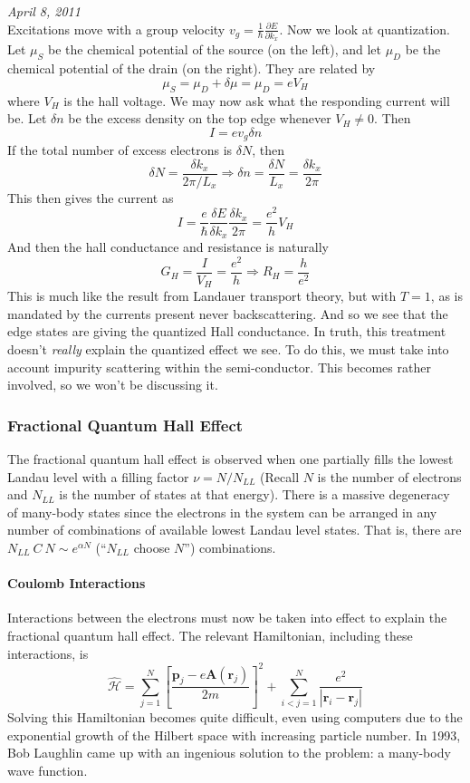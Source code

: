 \documentclass{article}
\begin{document}
	\noindent \textit{April 8, 2011}\\
	
	\noindent Excitations move with a group velocity $v_g=\frac{1}{\hbar}\frac{\partial E}{\partial k_x}$. Now we look at quantization. Let $\mu_S$ be the chemical potential of the source (on the left), and let $\mu_D$ be the chemical potential of the drain (on the right). They are related by
	$$\mu_S=\mu_D+\delta\mu=\mu_D=eV_H$$
	where $V_H$ is the hall voltage. We may now ask what the responding current will be. Let $\delta n$ be the excess density on the top edge whenever $V_H\neq 0$. Then 
	$$I=ev_g\delta n$$
	If the total number of excess electrons is $\delta N$, then
	$$\delta N=\frac{\delta k_x}{2\pi/L_x}\Rightarrow \delta n=\frac{\delta N}{L_x}=\frac{\delta k_x}{2\pi}$$
	This then gives the current as
	$$I=\frac{e}{\hbar}\frac{\delta E}{\delta k_x}\frac{\delta k_x}{2\pi}=\frac{e^2}{h}V_{H}$$
	And then the hall conductance and resistance is naturally
	$$G_H=\frac{I}{V_H}=\frac{e^2}{h}\Rightarrow R_H=\frac{h}{e^2}$$
	This is much like the result from Landauer transport theory, but with $T=1$, as is mandated by the currents present never backscattering. And so we see that the edge states are giving the quantized Hall conductance. In truth, this treatment doesn't \emph{really} explain the quantized effect we see. To do this, we must take into account impurity scattering within the semi-conductor. This becomes rather involved, so we won't be discussing it.
	
	\subsubsection{Fractional Quantum Hall Effect}
	The fractional quantum hall effect is observed when one partially fills the lowest Landau level with a filling factor $\nu=N/N_{LL}$ (Recall $N$ is the number of electrons and $N_{LL}$ is the number of states at that energy). There is a massive degeneracy of many-body states since the electrons in the system can be arranged in any number of combinations of available lowest Landau level states. That is, there are $N_{LL}\ C\ N\sim e^{\alpha N}$ (``$N_{LL}$ choose $N$'') combinations.
	\paragraph{Coulomb Interactions} Interactions between the electrons must now be taken into effect to explain the fractional quantum hall effect. The relevant Hamiltonian, including these interactions, is
	$$\hat{\mathscr{H}}=\sum_{j=1}^N\left[\frac{\mathbf{p}_j-e\mathbf{A}(\mathbf{r}_j)}{2m}\right]^2+\sum_{i<j=1}^N\frac{e^2}{\left|\mathbf{r}_i-\mathbf{r}_j\right|}$$
	Solving this Hamiltonian becomes quite difficult, even using computers due to the exponential growth of the Hilbert space with increasing particle number. In 1993, Bob Laughlin came up with an ingenious solution to the problem: a many-body wave function.
	
\end{document}
